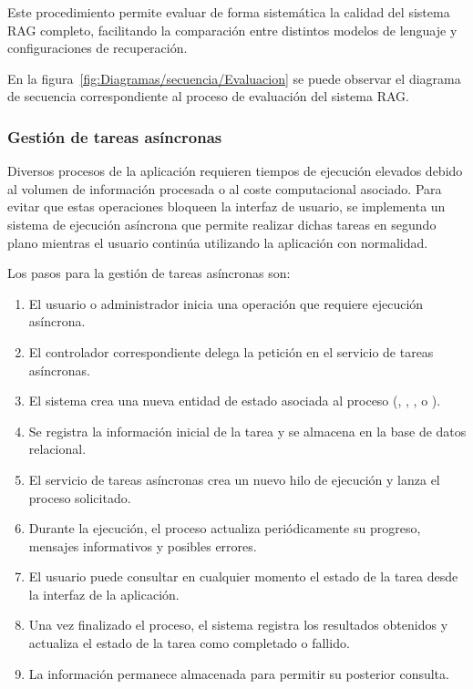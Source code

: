 Este procedimiento permite evaluar de forma sistemática la calidad del sistema RAG completo, facilitando la comparación entre distintos modelos de lenguaje y configuraciones de recuperación.

En la figura~\ref{fig:Diagramas/secuencia/Evaluacion} se puede observar el diagrama de secuencia correspondiente al proceso de evaluación del sistema RAG.


\subsubsection{Gestión de tareas asíncronas}

Diversos procesos de la aplicación requieren tiempos de ejecución elevados debido al volumen de información procesada o al coste computacional asociado. Para evitar que estas operaciones bloqueen la interfaz de usuario, se implementa un sistema de ejecución asíncrona que permite realizar dichas tareas en segundo plano mientras el usuario continúa utilizando la aplicación con normalidad.

Los pasos para la gestión de tareas asíncronas son:
\begin{enumerate}
	\item El usuario o administrador inicia una operación que requiere ejecución asíncrona.
	\item El controlador correspondiente delega la petición en el servicio de tareas asíncronas.
	\item El sistema crea una nueva entidad de estado asociada al proceso (, , ,  o ).
	\item Se registra la información inicial de la tarea y se almacena en la base de datos relacional.
	\item El servicio de tareas asíncronas crea un nuevo hilo de ejecución y lanza el proceso solicitado.
	\item Durante la ejecución, el proceso actualiza periódicamente su progreso, mensajes informativos y posibles errores.
	\item El usuario puede consultar en cualquier momento el estado de la tarea desde la interfaz de la aplicación.
	\item Una vez finalizado el proceso, el sistema registra los resultados obtenidos y actualiza el estado de la tarea como completado o fallido.
	\item La información permanece almacenada para permitir su posterior consulta.
\end{enumerate}

